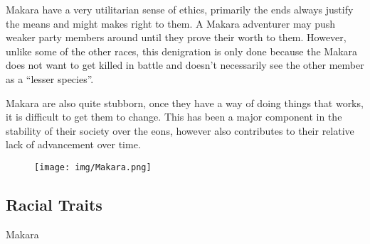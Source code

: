 Makara have a very utilitarian sense of ethics, primarily the ends always justify the means and might makes right to them. A Makara adventurer may push weaker party members around until they prove their worth to them. However, unlike some of the other races, this denigration is only done because the Makara does not want to get killed in battle and doesn’t necessarily see the other member as a “lesser species”.

Makara are also quite stubborn, once they have a way of doing things that works, it is difficult to get them to change. This has been a major component in the stability of their society over the eons, however also contributes to their relative lack of advancement over time.

\newpage

\begin{figure}[ht!]
	\texttt{[image: img/Makara.png]}
\end{figure}

\subsection*{Racial Traits}
\begin{monsterbox}{Makara}
	\vspace{.1in}
	\hline
	\stats[
	STR = +1,
	DEX = -1,
	VIT = +1,
	FOC = -1,
	WILL = +1
	]
	\hline
\end{monsterbox}